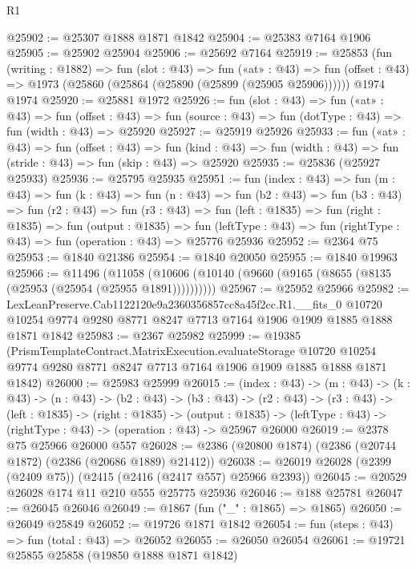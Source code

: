 \begin{lexlean}{R1}
\begin{coremodule}
@25902 := @25307 @1888 @1871 @1842
@25904 := @25383 @7164 @1906
@25905 := @25902 @25904
@25906 := @25692 @7164
@25919 := @25853
    (fun (writing : @1882) =>
    fun (slot : @43) =>
    fun («at» : @43) =>
    fun (offset : @43) => @1973 (@25860 (@25864 (@25890 (@25899 (@25905 @25906))))))
    @1974
    @1974
@25920 := @25881 @1972
@25926 := fun (slot : @43) =>
  fun («at» : @43) =>
  fun (offset : @43) => fun (source : @43) => fun (dotType : @43) => fun (width : @43) => @25920
@25927 := @25919 @25926
@25933 := fun («at» : @43) =>
  fun (offset : @43) =>
  fun (kind : @43) => fun (width : @43) => fun (stride : @43) => fun (skip : @43) => @25920
@25935 := @25836 (@25927 @25933)
@25936 := @25795 @25935
@25951 := fun (index : @43) =>
  fun (m : @43) =>
  fun (k : @43) =>
  fun (n : @43) =>
  fun (b2 : @43) =>
  fun (b3 : @43) =>
  fun (r2 : @43) =>
  fun (r3 : @43) =>
  fun (left : @1835) =>
  fun (right : @1835) =>
  fun (output : @1835) =>
  fun (leftType : @43) => fun (rightType : @43) => fun (operation : @43) => @25776 @25936
@25952 := @2364 @75
@25953 := @1840 @21386
@25954 := @1840 @20050
@25955 := @1840 @19963
@25966 := @11496
    (@11058 (@10606 (@10140 (@9660 (@9165 (@8655 (@8135 (@25953 (@25954 (@25955 @1891))))))))))
@25967 := @25952 @25966
@25982 := LexLeanPreserve.Cab1122120e9a2360356857cc8a45f2cc.R1.__fits_0
    @10720
    @10254
    @9774
    @9280
    @8771
    @8247
    @7713
    @7164
    @1906
    @1909
    @1885
    @1888
    @1871
    @1842
@25983 := @2367 @25982
@25999 := @19385
    (PrismTemplateContract.MatrixExecution.evaluateStorage
      @10720
      @10254
      @9774
      @9280
      @8771
      @8247
      @7713
      @7164
      @1906
      @1909
      @1885
      @1888
      @1871
      @1842)
@26000 := @25983 @25999
@26015 := (index : @43) ->
  (m : @43) ->
  (k : @43) ->
  (n : @43) ->
  (b2 : @43) ->
  (b3 : @43) ->
  (r2 : @43) ->
  (r3 : @43) ->
  (left : @1835) ->
  (right : @1835) ->
  (output : @1835) -> (leftType : @43) -> (rightType : @43) -> (operation : @43) -> @25967 @26000
@26019 := @2378 @75 @25966 @26000 @557
@26028 := @2386 (@20800 @1874) (@2386 (@20744 @1872) (@2386 (@20686 @1889) @21412))
@26038 := @26019 @26028 (@2399 (@2409 @75)) (@2415 (@2416 (@2417 @557) @25966 @2393))
@26045 := @20529 @26028 @174 @11 @210 @555 @25775 @25936
@26046 := @188 @25781
@26047 := @26045 @26046
@26049 := @1867 (fun ("_" : @1865) => @1865)
@26050 := @26049 @25849
@26052 := @19726 @1871 @1842
@26054 := fun (steps : @43) => fun (total : @43) => @26052
@26055 := @26050 @26054
@26061 := @19721 @25855 @25858 (@19850 @1888 @1871 @1842)

\end{coremodule}
\end{lexlean}
